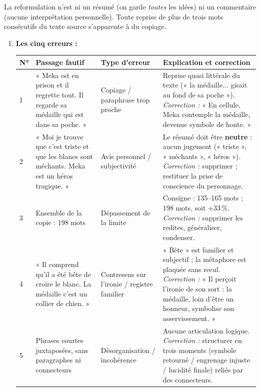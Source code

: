 \documentclass[11pt]{article}
\begin{document}
\begin{attention}
La reformulation n'est ni un résumé (on garde \emph{toutes} les idées) ni un commentaire (aucune interprétation personnelle). Toute reprise de plus de trois mots consécutifs du texte source s'apparente à du copiage.
\end{attention}

\begin{corrige}
\begin{enumerate}
    \item \textbf{Les cinq erreurs :}
    \begin{center}
    \begin{tabularx}{\linewidth}{|l|X|X|X|}\hline
    \rowcolor{popblueL}\textbf{N°} & \textbf{Passage fautif} & \textbf{Type d'erreur} & \textbf{Explication et correction} \\ \hline
    1 & « Meka est en prison et il regrette tout. Il regarde sa médaille qui est dans sa poche. » & Copiage / paraphrase trop proche & Reprise quasi littérale du texte (« la médaille... gisait au fond de sa poche »). \emph{Correction :} « En cellule, Meka contemple la médaille, devenue symbole de honte. » \\ \hline
    2 & « Moi je trouve que c'est triste et que les blancs sont méchants. Meka est un héros tragique. » & Avis personnel / subjectivité & Le résumé doit être \textbf{neutre} : aucun jugement (« triste », « méchants », « héros »). \emph{Correction :} supprimer ; restituer la prise de conscience du personnage. \\ \hline
    3 & Ensemble de la copie : 198 mots & Dépassement de la limite & Consigne : 135--165 mots ; 198 mots, soit +33\,\%. \emph{Correction :} supprimer les redites, généraliser, condenser. \\ \hline
    4 & « Il comprend qu'il a été bête de croire le blanc. La médaille c'est un collier de chien. » & Contresens sur l'ironie / registre familier & « Bête » est familier et subjectif ; la métaphore est plaquée sans recul. \emph{Correction :} « Il perçoit l'ironie de son sort : la médaille, loin d'être un honneur, symbolise son asservissement. » \\ \hline
    5 & Phrases courtes juxtaposées, sans paragraphes ni connecteurs & Désorganisation / incohérence & Aucune articulation logique. \emph{Correction :} structurer en trois moments (symbole retourné / engrenage injuste / lucidité finale) reliés par des connecteurs. \\ \hline

\end{tabularx}
\end{center}
\end{enumerate}
\end{corrige}
\end{document}
